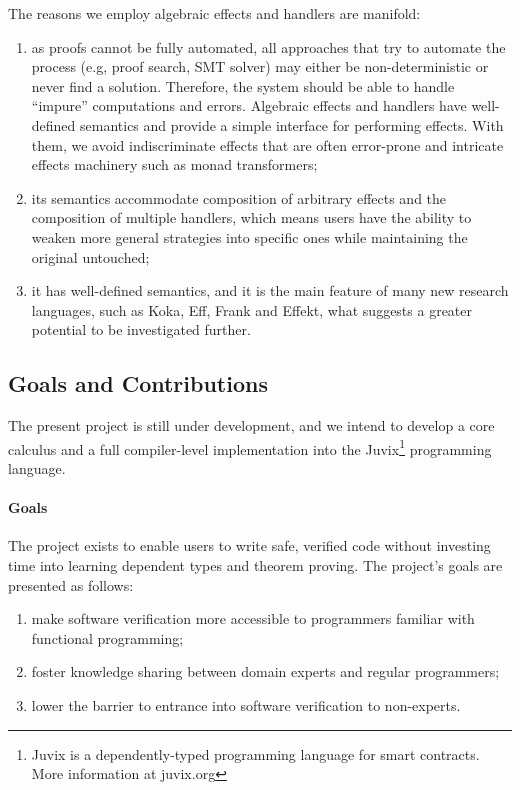 \documentclass[acmsmall]{acmart}
\begin{document}
The reasons we employ algebraic effects and handlers are manifold:
\begin{enumerate}
\item as proofs cannot be fully automated, all approaches that try to automate
  the process (e.g, proof search, SMT solver) may either be non-deterministic or
  never find a solution. Therefore, the system should be able to handle
  ``impure'' computations and errors. Algebraic effects and handlers have
  well-defined semantics and provide a simple interface for performing effects.
  With them, we avoid indiscriminate effects that are often error-prone and
  intricate effects machinery such as monad transformers;
\item its semantics accommodate composition of arbitrary effects and the
  composition of multiple handlers, which means users have the ability to weaken
  more general strategies into specific ones while maintaining the original untouched;
\item it has well-defined semantics, and it is the main feature of many new
  research languages, such as Koka, Eff, Frank and Effekt, what suggests a greater
  potential to be investigated further.
\end{enumerate}

\subsection{Goals and Contributions}

The present project is still under development, and we intend to develop a core calculus and a
full compiler-level implementation into the Juvix\footnote{Juvix is a
  dependently-typed programming language for smart contracts. More information
  at juvix.org} programming language.

\paragraph{Goals} The project exists to enable users to write safe, verified
code without investing time into learning dependent types and theorem proving.
The project's goals are presented as follows:
\begin{enumerate}
\item make software verification more accessible to programmers familiar with
  functional programming;
\item foster knowledge sharing between domain experts and regular programmers;
\item lower the barrier to entrance into software verification to non-experts.
\end{enumerate}
\end{document}

